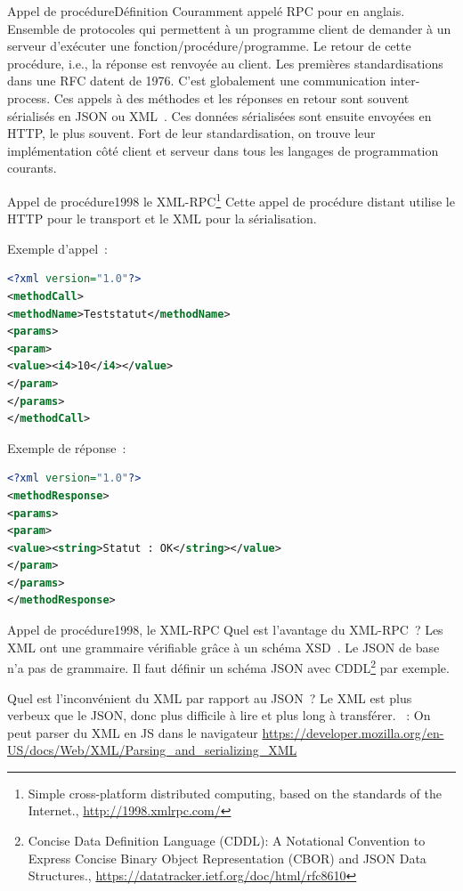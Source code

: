 \documentclass{beamer}
\begin{document}
    \begin{frame}{Appel de procédure}{Définition}
        Couramment appelé RPC pour  en anglais.
        \bigbreak
        Ensemble de protocoles qui permettent à un programme client de demander à un serveur d'exécuter une fonction/procédure/programme.
        Le retour de cette procédure, i.e., la réponse est renvoyée au client.
        \bigbreak
        Les premières standardisations dans une RFC datent de 1976.
        \bigbreak
        C'est globalement une communication inter-process.
        \bigbreak
        Ces appels à des méthodes et les réponses en retour sont souvent sérialisés en JSON ou XML~.
        Ces données sérialisées sont ensuite envoyées en HTTP, le plus souvent.
        \bigbreak
        Fort de leur standardisation, on trouve leur implémentation côté client et serveur dans tous les langages de programmation courants.
    \end{frame}

    \begin{frame}[fragile]{Appel de procédure}{1998 le XML-RPC\footnote{Simple cross-platform distributed computing, based on the standards of the Internet., \url{http://1998.xmlrpc.com/}}}
        Cette appel de procédure distant utilise le HTTP pour le transport et le XML pour la sérialisation.

        Exemple d'appel~:
        \begin{lstlisting}[language=xml,basicstyle=\ttfamily\tiny]
<?xml version="1.0"?>
<methodCall>
<methodName>Teststatut</methodName>
<params>
<param>
<value><i4>10</i4></value>
</param>
</params>
</methodCall>
        \end{lstlisting}
        Exemple de réponse~:
        \begin{lstlisting}[language=xml,basicstyle=\ttfamily\tiny]
<?xml version="1.0"?>
<methodResponse>
<params>
<param>
<value><string>Statut : OK</string></value>
</param>
</params>
</methodResponse>
        \end{lstlisting}
    \end{frame}

    \begin{frame}{Appel de procédure}{1998, le XML-RPC}
        Quel est l'avantage du XML-RPC~?
        \pause
        \bigbreak
        Les XML ont une grammaire vérifiable grâce à un schéma XSD~.
        Le JSON de base n'a pas de grammaire.
        Il faut définir un schéma JSON avec CDDL\footnote{Concise Data Definition Language (CDDL): A Notational Convention to Express Concise Binary Object Representation (CBOR) and JSON Data Structures., \url{https://datatracker.ietf.org/doc/html/rfc8610}} par exemple.

        Quel est l'inconvénient du XML par rapport au JSON~?
        \pause
        \bigbreak
        Le XML est plus verbeux que le JSON, donc plus difficile à lire et plus long à transférer.
        \bigbreak
        ~: On peut parser du XML en JS dans le navigateur \url{https://developer.mozilla.org/en-US/docs/Web/XML/Parsing_and_serializing_XML}
    \end{frame}
\end{document}
